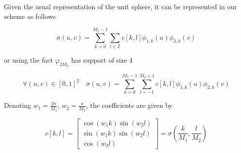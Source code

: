 \documentclass[a4paper, 11pt]{article}
\begin{document}
Given the usual representation of the unit sphere, it can be represented in our scheme as follows

\begin{equation}
    \sigma(u, v) = \sum_{k=0}^{M_1-1} \sum_{l \in \mathbb{Z}} c[k,l] \phi_{1,k}(u)\phi_{2, k}(v)
\end{equation}

or using the fact $\varphi_{2M_2}$ has support of size 4

\begin{equation}
  \boxed{\forall (u,v) \in {[0,1]}^2 \quad \sigma(u, v) = \sum_{k=0}^{M_1-1} \sum_{l=-1}^{M_2+1} c[k,l] 
  \phi_{1,k}(u)\phi_{2, k}(v)}
\end{equation}

Denoting $w_1 = \frac{2\pi}{M_1}$, $w_2 = \frac{\pi}{M_2}$, the coefficients are given by

\begin{equation}
  \boxed{c[k,l]=\begin{bmatrix} \cos(w_1k)\sin(w_2l) \\ \sin(w_1k)\sin(w_2l) \\ \cos(w_2l) 
  \end{bmatrix}=\sigma(\frac{k}{M_1}, \frac{l}{M_2})}
\end{equation}

%
%
%
%
%
\end{document}
